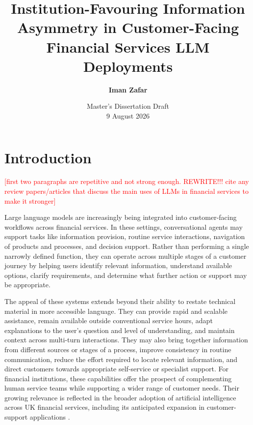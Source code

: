 \documentclass[12pt,a4paper,oneside]{report}
\title{Institution-Favouring Information Asymmetry in Customer-Facing Financial Services LLM Deployments}
\author{\textbf{Iman Zafar}}
\date{Master's Dissertation Draft\\9 August 2026}
\begin{document}
\maketitle

\tableofcontents
\clearpage
{}

\chapter{Introduction}
\label{chap:introduction}

\textcolor{red}{[first two paragraphs are repetitive and not strong enough. REWRITE!!! cite any review papers/articles that discuss the main uses of LLMs in financial services to make it stronger]}

Large language models are increasingly being integrated into customer-facing workflows across financial services. In these settings, conversational agents may support tasks like information provision, routine service interactions, navigation of products and processes, and decision support. Rather than performing a single narrowly defined function, they can operate across multiple stages of a customer journey by helping users identify relevant information, understand available options, clarify requirements, and determine what further action or support may be appropriate.

The appeal of these systems extends beyond their ability to restate technical material in more accessible language. They can provide rapid and scalable assistance, remain available outside conventional service hours, adapt explanations to the user's question and level of understanding, and maintain context across multi-turn interactions. They may also bring together information from different sources or stages of a process, improve consistency in routine communication, reduce the effort required to locate relevant information, and direct customers towards appropriate self-service or specialist support. For financial institutions, these capabilities offer the prospect of complementing human service teams while supporting a wider range of customer needs. Their growing relevance is reflected in the broader adoption of artificial intelligence across UK financial services, including its anticipated expansion in customer-support applications \parencite{boe_fca_2024_ai}.
\end{document}
